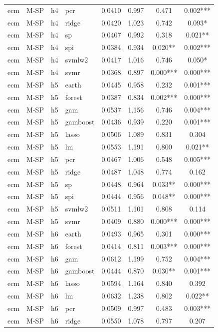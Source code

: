 \begin{ThreePartTable}
\begin{longtable}[t]{llclcccc}
ecm & M-SP & h4 & pcr & 0.0410 & 0.997 & 0.471 & 0.002***\\
ecm & M-SP & h4 & ridge & 0.0420 & 1.023 & 0.742 & 0.093*\\
ecm & M-SP & h4 & sp & 0.0407 & 0.992 & 0.318 & 0.021**\\
ecm & M-SP & h4 & spi & 0.0384 & 0.934 & 0.020** & 0.002***\\
ecm & M-SP & h4 & svmlw2 & 0.0417 & 1.016 & 0.746 & 0.050*\\
ecm & M-SP & h4 & svmr & 0.0368 & 0.897 & 0.000*** & 0.000***\\
\addlinespace
ecm & M-SP & h5 & earth & 0.0445 & 0.958 & 0.232 & 0.001***\\
ecm & M-SP & h5 & forest & 0.0387 & 0.834 & 0.002*** & 0.000***\\
ecm & M-SP & h5 & gam & 0.0537 & 1.156 & 0.746 & 0.004***\\
ecm & M-SP & h5 & gamboost & 0.0436 & 0.939 & 0.220 & 0.001***\\
ecm & M-SP & h5 & lasso & 0.0506 & 1.089 & 0.831 & 0.304\\
ecm & M-SP & h5 & lm & 0.0553 & 1.191 & 0.800 & 0.021**\\
ecm & M-SP & h5 & pcr & 0.0467 & 1.006 & 0.548 & 0.005***\\
ecm & M-SP & h5 & ridge & 0.0487 & 1.048 & 0.774 & 0.162\\
ecm & M-SP & h5 & sp & 0.0448 & 0.964 & 0.033** & 0.000***\\
ecm & M-SP & h5 & spi & 0.0444 & 0.956 & 0.048** & 0.000***\\
ecm & M-SP & h5 & svmlw2 & 0.0511 & 1.101 & 0.808 & 0.114\\
ecm & M-SP & h5 & svmr & 0.0409 & 0.880 & 0.000*** & 0.000***\\
\addlinespace
ecm & M-SP & h6 & earth & 0.0493 & 0.965 & 0.301 & 0.000***\\
ecm & M-SP & h6 & forest & 0.0414 & 0.811 & 0.003*** & 0.000***\\
ecm & M-SP & h6 & gam & 0.0612 & 1.199 & 0.752 & 0.004***\\
ecm & M-SP & h6 & gamboost & 0.0444 & 0.870 & 0.030** & 0.001***\\
ecm & M-SP & h6 & lasso & 0.0594 & 1.164 & 0.840 & 0.392\\
ecm & M-SP & h6 & lm & 0.0632 & 1.238 & 0.802 & 0.022**\\
ecm & M-SP & h6 & pcr & 0.0509 & 0.997 & 0.483 & 0.003***\\
ecm & M-SP & h6 & ridge & 0.0550 & 1.078 & 0.797 & 0.207\\

\end{longtable}
\end{ThreePartTable}

